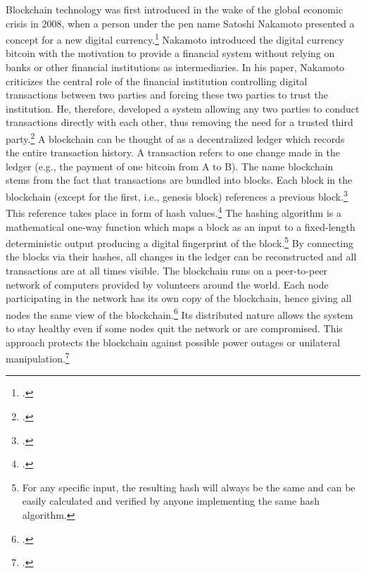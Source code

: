 Blockchain technology was first introduced in the wake of the global economic crisis in 2008, when a person under the pen name Satoshi Nakamoto presented a concept for a new digital currency.\footcite[Cf.][]{Nakamoto.2008} Nakamoto introduced the digital currency bitcoin with the motivation to provide a financial system without relying on banks or other financial institutions as intermediaries. In his paper, Nakamoto criticizes the central role of the financial institution controlling digital transactions between two parties and forcing these two parties to trust the institution. He, therefore, developed a system allowing any two parties to conduct transactions directly with each other, thus removing the need for a trusted third party.\footcite[Cf.][p.2]{Nakamoto.2008} A blockchain can be thought of as a decentralized ledger which records the entire transaction history. A transaction refers to one change made in the ledger (e.g., the payment of one bitcoin from A to B). The name blockchain stems from the fact that transactions are bundled into blocks. Each block in the blockchain (except for the first, i.e., genesis block) references a previous block.\footcite[Cf.][chapter 1]{BashirMasteringBlockchain2017} This reference takes place in form of hash values.\footcite[Cf.][p.351]{AntonopolousAndreasM..2017} The hashing algorithm is a mathematical one-way function which maps a block as an input to a fixed-length deterministic output producing a digital fingerprint of the block.\footnote{For any specific input, the resulting hash will always be the same and can be easily calculated and verified by anyone implementing the same hash algorithm.} By connecting the blocks via their hashes, all changes in the ledger can be reconstructed and all transactions are at all times visible. The blockchain runs on a peer-to-peer network of computers provided by volunteers around the world. Each node participating in the network has its own copy of the blockchain, hence giving all nodes the same view of the blockchain.\footcites[Cf.][p.5]{Tapscott.2017}[cf.][p.41]{Welzel.2017} Its distributed nature allows the system to stay healthy even if some nodes quit the network or are compromised. This approach protects the blockchain against possible power outages or unilateral manipulation.\footcite[Cf.][p.8]{Nakamoto.2008}

